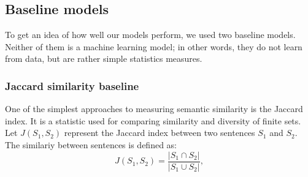 \documentclass[10pt, a4paper]{article}
\begin{document}
%
%
%
\subsection{Baseline models}

To get an idea of how well our models perform, we used two baseline models.
Neither of them is a machine learning model; in other words, they do not learn from data, but are rather simple statistics measures.

\subsubsection{Jaccard similarity baseline}

One of the simplest approaches to measuring semantic similarity is the Jaccard index.
It is a statistic used for comparing similarity and diversity of finite sets.
Let $J(S_1, S_2)$ represent the Jaccard index between two sentences $S_1$ and $S_2$.
The similariy between sentences is defined as:
\begin{equation}
	\label{eq:jaccard}
	J(S_1, S_2) = \frac{|S_1 \cap S_2|}{|S_1 \cup S_2|},
\end{equation}
\end{document}
